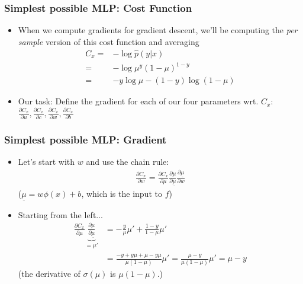 \documentclass{beamer}
\begin{document}
\begin{frame}
\frametitle{Simplest possible MLP: Cost Function}

\begin{itemize}
\item When we compute gradients for gradient descent, we'll be computing the \textit{per sample} version of this cost function and averaging
\begin{align*}
    C_x =& - \log \hat{p}(y|x) \\
    =& - \log \mu^y (1-\mu)^{1-y} \\
    =& - y \log \mu - (1-y) \log (1-\mu)
\end{align*}
\item Our task: Define the gradient for each of our four parameters wrt. $C_x$: $\frac{\partial C_x}{\partial u}, \frac{\partial C_x}{\partial c}, \frac{\partial C_x}{\partial w}, \frac{\partial C_x}{\partial b}$

\end{itemize}

\end{frame}




\begin{frame}
\frametitle{Simplest possible MLP: Gradient}

\begin{itemize}
\item Let's start with $w$ and use the chain rule:
\begin{align*}
    \frac{\partial C_x}{\partial w} = \frac{\partial C_x}{\partial \mu}
    \frac{\partial \mu}{\partial \underline{\mu}}
    \frac{\partial \underline{\mu}}{\partial w}
\end{align*}
($\underline{\mu} = w \phi(x) + b$, which is the input to $f$)
\item Starting from the left...
\begin{align*}
    \frac{\partial C_x}{\partial \mu} \underbrace{\frac{\partial \mu}{\partial
    \underline{\mu}}}_{=\mu'} & = 
    -\frac{y}{\mu}\mu' +
    \frac{1-y}{1-\mu}\mu'\\ 
   & = \frac{-y + y\mu + \mu - y\mu }{\mu(1-\mu)}\mu' 
    = \frac{\mu - y}{\mu(1-\mu)}\mu' 
    = \mu - y
\end{align*}
(the derivative of $\sigma(\mu)$ is $\mu (1-\mu)$.)
\end{itemize}

\end{frame}
\end{document}
